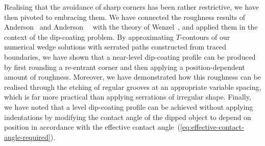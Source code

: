 Realising that the avoidance of sharp corners has been rather restrictive,
we have then pivoted to embracing them.
We have connected the roughness results of
Anderson~\cite{anderson-2002-thesis-boundary-tracing-pdes}
and Anderson~\etal~\cite{anderson-2006-exact-solutions-laplace-young}
with the theory of Wenzel~\cite{wenzel-1936-resistance-solid-surfaces-wetting},
and applied them in the context of the dip-coating problem.
By approximating $T$-contours of our numerical wedge solutions
with serrated paths constructed from traced boundaries,
we have shown that a near-level dip-coating profile can be produced
by first rounding a re-entrant corner
and then applying a position-dependent amount of roughness.
Moreover, we have demonstrated how this roughness can be realised
through the etching of regular grooves at an appropriate variable spacing,
which is far more practical than applying serrations of irregular shape.
Finally, we have noted that
a level dip-coating profile can be achieved without applying indentations
by modifying the contact angle of the dipped object
to depend on position in accordance with
the effective contact angle~(\ref{eq:effective-contact-angle-required}).
